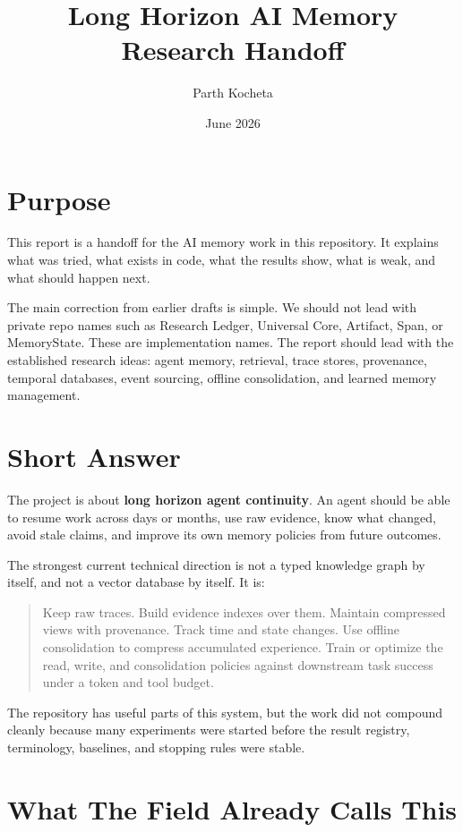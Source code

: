 \documentclass[11pt]{article}
\title{Long Horizon AI Memory Research Handoff}
\author{Parth Kocheta}
\date{June 2026}
\begin{document}
\maketitle

\section*{Purpose}

This report is a handoff for the AI memory work in this repository. It explains what was tried, what exists in code, what the results show, what is weak, and what should happen next.

The main correction from earlier drafts is simple. We should not lead with private repo names such as Research Ledger, Universal Core, Artifact, Span, or MemoryState. These are implementation names. The report should lead with the established research ideas: agent memory, retrieval, trace stores, provenance, temporal databases, event sourcing, offline consolidation, and learned memory management.

\section{Short Answer}

The project is about \textbf{long horizon agent continuity}. An agent should be able to resume work across days or months, use raw evidence, know what changed, avoid stale claims, and improve its own memory policies from future outcomes.

The strongest current technical direction is not a typed knowledge graph by itself, and not a vector database by itself. It is:

\begin{quote}
Keep raw traces. Build evidence indexes over them. Maintain compressed views with provenance. Track time and state changes. Use offline consolidation to compress accumulated experience. Train or optimize the read, write, and consolidation policies against downstream task success under a token and tool budget.
\end{quote}

The repository has useful parts of this system, but the work did not compound cleanly because many experiments were started before the result registry, terminology, baselines, and stopping rules were stable.

\section{What The Field Already Calls This}
\end{document}

